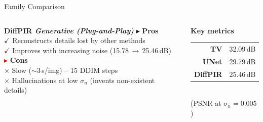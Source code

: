 \documentclass[english,10pt]{beamer}
\begin{document}
\begin{frame}{Family Comparison}
  \vspace{0.25cm}

  \begin{columns}[t]
      {%
      \begin{block}{\small\bfseries DiffPIR  \hfill \scriptsize\itshape Generative (Plug-and-Play)}
        \scriptsize
        \textcolor{green!50!black}{$\blacktriangleright$} \textbf{Pros}\\[0.05cm]
        \hspace{0.3cm}$\checkmark$ Reconstructs details lost by other methods\\
        \hspace{0.3cm}$\checkmark$ Improves with increasing noise (15.78\,$\to$\,25.46\,dB)\\[0.08cm]
        \textcolor{red}{$\blacktriangleright$} \textbf{Cons}\\[0.05cm]
        \hspace{0.3cm}$\times$  Slow ($\sim$3\,s/img) -- 15 DDIM steps\\
        \hspace{0.3cm}$\times$  Hallucinations at low $\sigma_n$ (invents non-existent details)
      \end{block}}
      \begin{center}
        \textbf{Key metrics}\\[0.15cm]
        \begin{tabular}{rl}\small
          \textbf{TV} & 32.09\,dB\\
          \textbf{UNet} & 29.79\,dB\\
          \textbf{DiffPIR} & 25.46\,dB\\
        \end{tabular}\\[0.1cm]
        \scriptsize (PSNR at $\sigma_n=0.005$)
      \end{center}
  \end{columns}
\end{frame}
\end{document}
